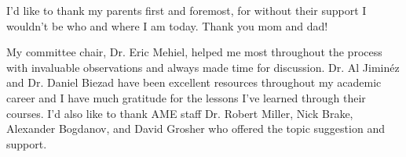 \documentclass[12pt]{ucthesis}
\begin{document}
\begin{frontmatter}
	\begin{acknowledgements}
		
		I'd like to thank my parents first and foremost, for without their support I wouldn't be who and where I am today. Thank you mom and dad!
		
		My committee chair, Dr. Eric Mehiel, helped me most throughout the process with invaluable observations and always made time for discussion. Dr. Al Jimin\'{e}z and Dr. Daniel Biezad have been excellent resources throughout my academic career and I have much gratitude for the lessons I've learned through their courses. I'd also like to thank AME staff Dr. Robert Miller, Nick Brake, Alexander Bogdanov, and David Grosher who offered the topic suggestion and support.
	\end{acknowledgements}
	
	\cleardoublepage
	\tableofcontents
	\listoftables
	\listoffigures
	\printnomenclature[0.75in]
	
	

\end{frontmatter}


\pagestyle{plain}
\renewcommand{\baselinestretch}{1.66}
\end{document}
